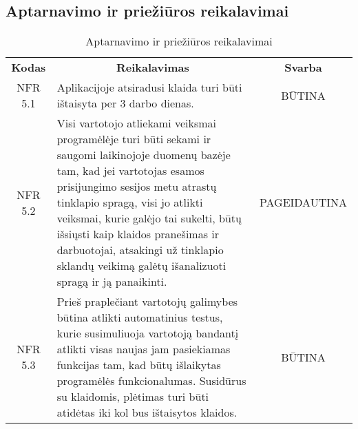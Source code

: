\documentclass{VUMIFPSkursinis}
\begin{document}
\subsection{Aptarnavimo ir priežiūros reikalavimai}
\begin{center}
	\begin{table}[H]
	\begin{tabular}{|p{2cm}|p{}|p{}|}
	\hline
	    \rowcolor{lightgray}
		\multicolumn{3}{|c|}{Aptarnavimo ir priežiūros reikalavimai}\\
		
	\hline
		\multicolumn{1}{|c|}{{\bfseries Kodas}}&
		\multicolumn{1}{|c|}{{\bfseries Reikalavimas}}&
		\multicolumn{1}{|c|}{{\bfseries Svarba}}\\
	\hline 	
		\multicolumn{1}{|c|}{NFR 5.1}&
		{Aplikacijoje atsiradusi klaida turi būti ištaisyta per 3 darbo dienas.}&
		\multicolumn{1}{|c|}{BŪTINA}\\	
	
	\hline 	
		\multicolumn{1}{|c|}{NFR 5.2}&
		{Visi vartotojo atliekami veiksmai programėlėje turi būti sekami ir saugomi laikinojoje duomenų bazėje tam, kad jei vartotojas esamos prisijungimo sesijos metu atrastų tinklapio spragą, visi jo atlikti veiksmai, kurie galėjo tai sukelti, būtų išsiųsti kaip klaidos pranešimas ir darbuotojai, atsakingi už tinklapio sklandų veikimą galėtų išanalizuoti spragą ir ją panaikinti.}&
		\multicolumn{1}{|p{1.5cm}|}{PAGEIDAUTINA}\\
	
	\hline 	
		\multicolumn{1}{|c|}{NFR 5.3}&
		{Prieš praplečiant vartotojų galimybes būtina atlikti automatinius testus, kurie susimuliuoja vartotoją bandantį atlikti visas naujas jam pasiekiamas funkcijas tam, kad būtų išlaikytas programėlės funkcionalumas. Susidūrus su klaidomis, plėtimas turi būti atidėtas iki kol bus ištaisytos klaidos.}&
		\multicolumn{1}{|c|}{BŪTINA}\\	
		
	\hline 	
	
	\end{tabular}
	\caption{Aptarnavimo ir priežiūros reikalavimai}
	\label{table:Aptarnavimoirpriežiūrosreikalavimai}
	\end{table}

\end{center}
\end{document}
